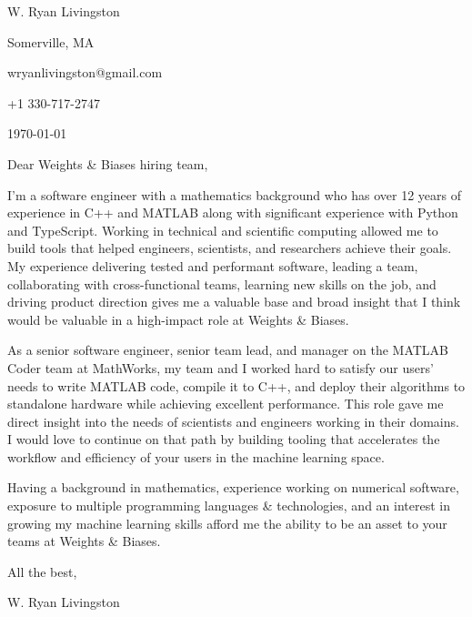 \documentclass[
    10pt %
]{article}
\begin{document}
\begin{minipage}{\linewidth}
W. Ryan Livingston

Somerville, MA

wryanlivingston@gmail.com

+1 330-717-2747

\today
\end{minipage}


Dear Weights \& Biases hiring team,

I'm a software engineer with a mathematics background who has over 12 years of experience in C++ and MATLAB along with significant experience with Python and TypeScript. Working in technical and scientific computing allowed me to build tools that helped engineers, scientists, and researchers achieve their goals. My experience delivering tested and performant software, leading a team, collaborating with cross-functional teams, learning new skills on the job, and driving product direction gives me a valuable base and broad insight that I think would be valuable in a high-impact role at Weights \& Biases.

As a senior software engineer, senior team lead, and manager on the MATLAB Coder team at MathWorks, my team and I worked hard to satisfy our users' needs to write MATLAB code, compile it to C++, and deploy their algorithms to standalone hardware while achieving excellent performance. This role gave me direct insight into the needs of scientists and engineers working in their domains. I would love to continue on that path by building tooling that accelerates the workflow and efficiency of your users in the machine learning space.

Having a background in mathematics, experience working on numerical software, exposure to multiple programming languages \& technologies, and an interest in growing my machine learning skills afford me the ability to be an asset to your teams at Weights \& Biases.

All the best,

W. Ryan Livingston
\end{document}
